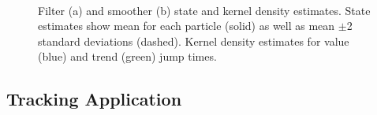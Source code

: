 \documentclass[journal]{IEEEtran}
\begin{document}
\begin{figure}[!t]
\centering
{} \\
\caption{Filter (a) and smoother (b) state and kernel density estimates. State estimates show mean for each particle (solid) as well as mean $\pm$2 standard deviations (dashed). Kernel density estimates for value (blue) and trend (green) jump times.}
\label{fig:fx_results}
\end{figure}



\subsection{Tracking Application}
\end{document}
